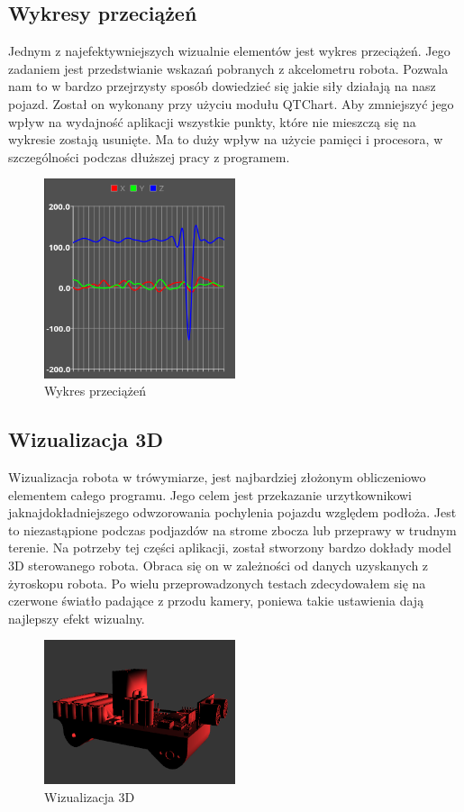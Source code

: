 \documentclass[12pt,a4paper,polish]{article}
\begin{document}
  \subsection{Wykresy przeciążeń}
  Jednym z najefektywniejszych wizualnie elementów jest wykres przeciążeń.
  Jego zadaniem jest przedstwianie wskazań pobranych z akcelometru robota.
  Pozwala nam to w bardzo przejrzysty sposób dowiedzieć się jakie siły
  działają na nasz pojazd. Został on wykonany przy użyciu modułu QTChart.
  Aby zmniejszyć jego wpływ na wydajność aplikacji wszystkie punkty, które
  nie mieszczą się na wykresie zostają usunięte. Ma to duży wpływ na użycie
  pamięci i procesora, w szczególności podczas dłuższej pracy z programem.

  \begin{figure}[h]
    \centering
    \includegraphics[width=0.5\textwidth]{img/final/chart.png}
    \caption{Wykres przeciążeń}
    \label{fig:chart}
  \end{figure}

  \subsection{Wizualizacja 3D}
  Wizualizacja robota w trówymiarze, jest najbardziej złożonym obliczeniowo
  elementem całego programu. Jego celem jest przekazanie urzytkownikowi 
  jaknajdokładniejszego odwzorowania pochylenia pojazdu względem podłoża.
  Jest to niezastąpione podczas podjazdów na strome zbocza lub przeprawy 
  w trudnym terenie. Na potrzeby tej części aplikacji, został stworzony
  bardzo dokłady model 3D sterowanego robota. Obraca się on  w zależności 
  od danych uzyskanych z żyroskopu robota. Po wielu przeprowadzonych
  testach zdecydowałem się na czerwone światło padające z przodu kamery,
  poniewa takie ustawienia dają najlepszy efekt wizualny.

  \begin{figure}[h]
    \centering
    \includegraphics[width=0.5\textwidth]{img/final/3d.png}
    \caption{Wizualizacja 3D}
    \label{fig:3d}
  \end{figure}
\end{document}
